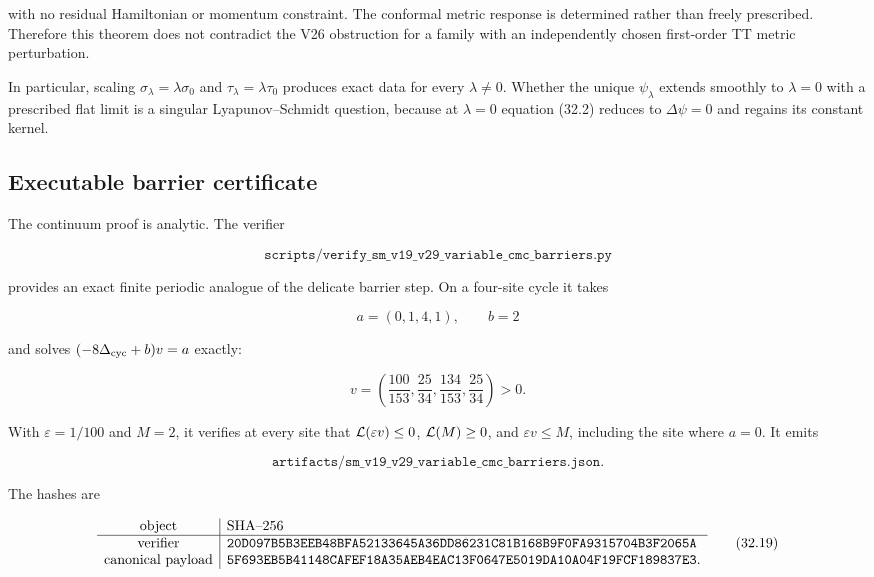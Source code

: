 \documentclass[11pt]{article}
\theoremstyle{remark}
\begin{document}
with no residual Hamiltonian or momentum constraint.  The conformal
metric response is determined rather than freely prescribed.  Therefore
this theorem does not contradict the V26 obstruction for a family with
an independently chosen first-order TT metric perturbation.

In particular, scaling
\(\sigma_\lambda=\lambda\sigma_0\) and
\(\tau_\lambda=\lambda\tau_0\) produces exact data for every
\(\lambda\neq0\).  Whether the unique \(\psi_\lambda\) extends smoothly
to \(\lambda=0\) with a prescribed flat limit is a singular
Lyapunov--Schmidt question, because at \(\lambda=0\) equation (32.2)
reduces to \(\Delta\psi=0\) and regains its constant kernel.

\subsection{Executable barrier certificate}

The continuum proof is analytic.  The verifier

\[
 \texttt{scripts/verify\_sm\_v19\_v29\_variable\_cmc\_barriers.py}
                                                                    \tag{32.15}
\]

provides an exact finite periodic analogue of the delicate barrier step.
On a four-site cycle it takes

\[
 a=(0,1,4,1),\qquad b=2                                      \tag{32.16}
\]

and solves \((-8\Delta_{\rm cyc}+b)v=a\) exactly:

\[
 v=\left(\frac{100}{153},\frac{25}{34},
          \frac{134}{153},\frac{25}{34}\right)>0.             \tag{32.17}
\]

With \(\varepsilon=1/100\) and \(M=2\), it verifies at every site that
\({\cal L}(\varepsilon v)\leq0\),
\({\cal L}(M)\geq0\), and
\(\varepsilon v\leq M\), including the site where \(a=0\).
It emits

\[
 \texttt{artifacts/sm\_v19\_v29\_variable\_cmc\_barriers.json}. \tag{32.18}
\]

The hashes are

\[
\begin{array}{c|l}
\hbox{object}&\hbox{SHA--256}\\ \hline
\hbox{verifier}&
\texttt{20D097B5B3EEB48BFA52133645A36DD86231C81B168B9F0FA9315704B3F2065A}\\
\hbox{canonical payload}&
\texttt{5F693EB5B41148CAFEF18A35AEB4EAC13F0647E5019DA10A04F19FCF189837E3}.
\end{array}                                                     \tag{32.19}
\]
\end{document}
